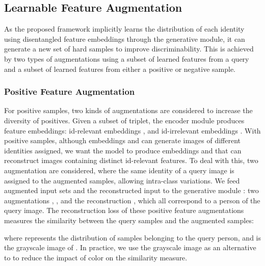 \subsection{Learnable Feature Augmentation} 
\label{sec:reconstruction_loss}
As the proposed framework implicitly learns the distribution of each identity using disentangled feature embeddings through the generative module,  it can generate a new set of hard samples to improve discriminability. This is achieved by two types of augmentations using a subset of learned features from a query and a subset of learned features from either a positive or negative sample.  
\subsubsection{Positive Feature Augmentation} For positive samples, two kinds of augmentations are considered to increase the diversity of positives. Given a subset  of triplet, the encoder module produces feature embeddings: id-relevant embeddings , and id-irrelevant embeddings  . 
With positive samples, although embeddings  and  can generate images of different identities assigned, we want the model to produce embeddings  and  that can reconstruct images containing distinct id-relevant features.
To deal with this, two augmentation are considered, where the same identity of a query image is assigned to the augmented samples, allowing intra-class variations. We feed augmented input sets and the reconstructed input to the generative module : two augmentations , , and the reconstruction , which all correspond to a person of the query image. The reconstruction loss of these positive feature augmentations measures the similarity between the query samples and the augmented samples: 

where  represents the distribution of samples belonging to the query person, and  is the grayscale image of . In practice, we use the grayscale image as an alternative to  to reduce the impact of color on the similarity measure. 

